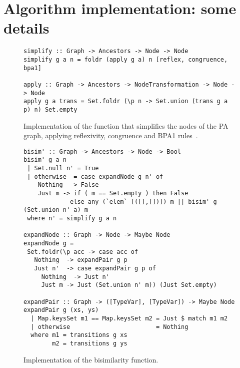 \appendix
\section{Algorithm implementation: some details}
\label{app:algorithm}

\begin{figure}[h!]
\begin{lstlisting}
simplify :: Graph -> Ancestors -> Node -> Node
simplify g a n = foldr (apply g a) n [reflex, congruence, bpa1]

apply :: Graph -> Ancestors -> NodeTransformation -> Node -> Node
apply g a trans = Set.foldr (\p n -> Set.union (trans g a p) n) Set.empty
\end{lstlisting}
\label{fig:simplify}
\caption{Implementation of the function that simplifies the nodes of the PA graph, applying reflexivity, congruence and BPA1 rules~\cite{janvcar1999techniques}.}
\end{figure}


\begin{figure}[h!]
\begin{lstlisting}
bisim' :: Graph -> Ancestors -> Node -> Bool
bisim' g a n
 | Set.null n' = True
 | otherwise  = case expandNode g n' of
    Nothing  -> False
    Just m -> if ( m == Set.empty ) then False
             else any (`elem` [([],[])]) m || bisim' g (Set.union n' a) m
 where n' = simplify g a n
  
expandNode :: Graph -> Node -> Maybe Node
expandNode g =
 Set.foldr(\p acc -> case acc of
   Nothing  -> expandPair g p
   Just n'  -> case expandPair g p of
     Nothing  -> Just n'
     Just m -> Just (Set.union n' m)) (Just Set.empty)

expandPair :: Graph -> ([TypeVar], [TypeVar]) -> Maybe Node
expandPair g (xs, ys)
  | Map.keysSet m1 == Map.keysSet m2 = Just $ match m1 m2
  | otherwise                        = Nothing
  where m1 = transitions g xs
        m2 = transitions g ys
\end{lstlisting}
\label{fig:bisim}
\caption{Implementation of the bisimilarity function.}
\end{figure}